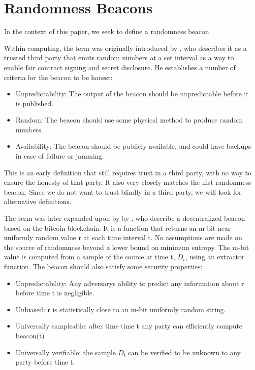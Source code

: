 \section{Randomness Beacons}

In the context of this paper, we seek to define a randomness beacon.

Within computing, the term was originally introduced by \citet{rabin1983beacon}, who describes it as a trusted third party that emits random numbers at a set interval as a way to enable fair contract signing and secret disclosure. He establishes a number of criteria for the beacon to be honest:

\begin{itemize}
    \item Unpredictability: The output of the beacon should be unpredictable before it is published. 
    \item Random: The beacon should use some physical method to produce random numbers.  
    \item Availability: The beacon should be publicly available, and could have backups in case of failure or jamming. 
\end{itemize}

This is an early definition that still requires trust in a third party, with no way to ensure the honesty of that party. It also very closely matches the \gls{nist} randomness beacon. Since we do not want to trust blindly in a third party, we will look for alternative definitions. 

The term was later expanded upon by by \citet{bonneau2015bitcoin}, who describe a decentralized beacon based on the bitcoin blockchain. It is a function that returns an m-bit near-uniformly random value r at each time interval t. No assumptions are made on the source of randomness beyond a lower bound on minimum entropy. The m-bit value is computed from a sample of the source at time t, $ D_t $, using an extractor function. The beacon should also satisfy some security properties: 

\begin{itemize}
    \item Unpredictability: Any adversarys ability to predict any information about r before time t is negligible. 
    \item Unbiased: r is statistically close to an m-bit uniformly random string.
    \item Universally sampleable: after time time t any party can efficiently compute beacon(t)
    \item Universally verifiable: the sample $ D_t $ can be verified to be unknown to any party before time t. 
\end{itemize}

